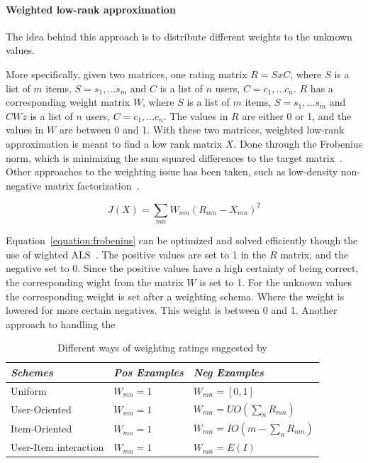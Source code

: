 \paragraph{Weighted low-rank approximation}

\cite{pan2008} \cite{Nati03weightedlow-rank}
The idea behind this approach is to distribute different weights to the unknown
values.

More specifically, given two matrices, one rating matrix $R = SxC$, where $S$
is a list of $m$ items, $S = {s_{1},...s_{m}}$ and $C$ is a list of $n$ users,
$C = {c_{1}, ... c_{n}}$.
$R$ has a corresponding weight matrix $W$, where $S$ is a list of $m$ items, $S
= {s_{1},...s_{m}}$ and $CWz$ is a list of $n$ users, $C = {c_{1}, ... c_{n}}$.
The values in $R$ are either 0 or 1, and the values in $W$ are between 0 and 1.
With these two matrices, weighted low-rank approximation is meant to find a low
rank matrix $X$.  Done through the Frobenius norm, which is minimizing the sum
squared differences to the target matrix~\cite{frobeniusNorm}.  Other
approaches to the weighting issue has been taken, such as low-density
non-negative matrix factorization~\cite{Sindhwani:2010:OMC:1933307.1934641}.

\begin{equation}
    J(X) = \sum_{mn} W_{mn}(R_{mn} - X_{mn})^2
    \label{equation:frobenius}
\end{equation}

Equation~\ref{equation:frobenius} can be optimized and solved efficiently
though the use of wighted ALS~\citep{Koren2009}.  The positive values are set
to 1 in the $R$ matrix, and the negative set to 0.
Since the positive values have a high certainty of being correct, the
corresponding wight from the matrix $W$ is set to 1.  For the unknown values
the corresponding weight is set after a weighting schema.  Where the weight is
lowered for more certain negatives.  This weight is between 0 and 1.  Another
approach to handling the

\begin{table}[H]
    \centering
    \begin{tabular}{l|l|l}
      \emph{Schemes}      & \emph{Pos Examples} & \emph{Neg Examples} \\ \hline
      Uniform               & $W_{mn} = 1$ & $W_{mn} = [0,1]$ \\ \hline
      User-Oriented         & $W_{mn} = 1$ & $W_{mn} = UO(\sum_{n} R_{mn})$ \\ \hline
      Item-Oriented         & $W_{mn} = 1$ & $W_{mn} = IO(m - \sum_{n} R_{mn})$ \\ \hline
      User-Item interaction & $W_{mn} = 1$ & $W_{mn} = E(I)$  \\
    \end{tabular}
    \caption[Weighting Schemes]{Different ways of weighting ratings suggested by \cite{pan2008}}
    \label{table:WeightingSchemes}
\end{table}

